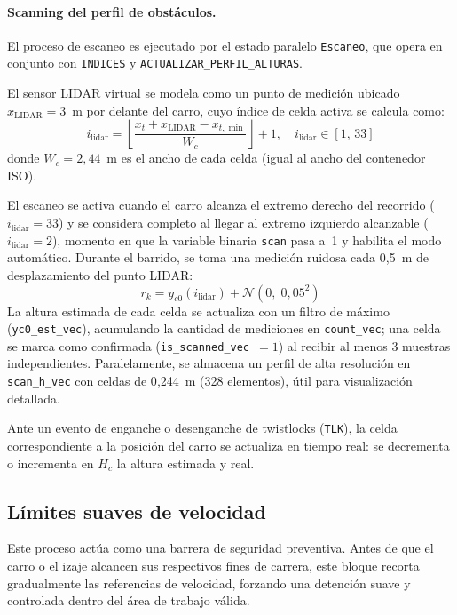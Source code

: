 \paragraph{Scanning del perfil de obstáculos.}
El proceso de escaneo es ejecutado por el estado paralelo \texttt{Escaneo}, que opera en conjunto con \texttt{INDICES} y \texttt{ACTUALIZAR\_PERFIL\_ALTURAS}.

El sensor LIDAR virtual se modela como un punto de medición ubicado $x_{\text{LIDAR}} = 3$~m por delante del carro, cuyo índice de celda activa se calcula como:
\begin{equation}
    i_{\text{lidar}} = \left\lfloor \frac{x_t + x_{\text{LIDAR}} - x_{t,\min}}{W_c} \right\rfloor + 1, \quad i_{\text{lidar}} \in [1,\, 33]
\end{equation}
donde $W_c = 2{,}44$~m es el ancho de cada celda (igual al ancho del contenedor ISO).

El escaneo se activa cuando el carro alcanza el extremo derecho del recorrido ($i_{\text{lidar}} = 33$) y se considera completo al llegar al extremo izquierdo alcanzable ($i_{\text{lidar}} = 2$), momento en que la variable binaria \texttt{scan} pasa a~1 y habilita el modo automático. Durante el barrido, se toma una medición ruidosa cada 0{,}5~m de desplazamiento del punto LIDAR:
\begin{equation}
    r_k = y_{c0}(i_{\text{lidar}}) + \mathcal{N}(0,\; 0{,}05^2)
\end{equation}
La altura estimada de cada celda se actualiza con un filtro de máximo (\texttt{yc0\_est\_vec}), acumulando la cantidad de mediciones en \texttt{count\_vec}; una celda se marca como confirmada (\texttt{is\_scanned\_vec}~$= 1$) al recibir al menos 3 muestras independientes. Paralelamente, se almacena un perfil de alta resolución en \texttt{scan\_h\_vec} con celdas de 0{,}244~m (328 elementos), útil para visualización detallada.

Ante un evento de enganche o desenganche de twistlocks (\texttt{TLK}), la celda correspondiente a la posición del carro se actualiza en tiempo real: se decrementa o incrementa en $H_c$ la altura estimada y real.

\subsection{Límites suaves de velocidad}

Este proceso actúa como una barrera de seguridad preventiva. Antes de que el carro o el izaje
alcancen sus respectivos fines de carrera, este bloque recorta gradualmente las referencias de velocidad, forzando una detención
suave y controlada dentro del área de trabajo válida.

